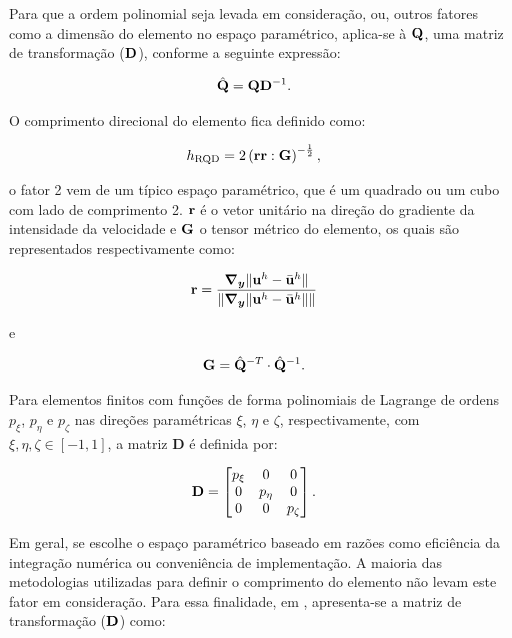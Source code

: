 \documentclass[tese_patricia]{subfiles}%
\begin{document}
Para que a ordem polinomial seja levada em consideração, ou, outros fatores como a dimensão do elemento no espaço paramétrico, aplica-se à $\mathbf{Q}$, uma matriz de transformação ($\mathbf{D}$), conforme a seguinte expressão:

\begin{align}
	\hat{\mathbf{Q}}&=\mathbf{Q}\mathbf{D}^{-1} \label{eq:q_chap}.
\end{align}

O comprimento direcional do elemento fica definido como:

\begin{align}
	h_{\mathrm{RQD}} &=2\left(\mathbf{r}\mathbf{r} : \mathbf{G} \right)^{-\frac{1}{2}},
\end{align}

\noindent o fator 2 vem de um típico espaço paramétrico, que é um quadrado ou um cubo com lado de comprimento 2. $\mathbf{r}$ é o vetor unitário na direção do gradiente da intensidade da velocidade e $\mathbf{G}$ o tensor métrico do elemento, os quais são representados respectivamente como:

\begin{align}
	\mathbf{r}&=\frac{\boldsymbol{\nabla_y} \lVert\mathbf{u}^h - \bar{\mathbf{u}}^h\rVert}{\lVert \boldsymbol{\nabla_y} \lVert\mathbf{u}^h - \bar{\mathbf{u}}^h\rVert\rVert} \label{eq:rRGN}
\end{align}

\noindent e

\begin{align}
	\mathbf{G} &= \hat{\mathbf{Q}}^{-T} \cdot \hat{\mathbf{Q}}^{-1}. \label{eq:tensor_metrico}
\end{align}

Para elementos finitos com funções de forma polinomiais de Lagrange de ordens $p_\xi$, $p_\eta$ e $p_\zeta$ nas direções paramétricas $\xi$, $\eta$ e $\zeta$, respectivamente, com $\xi, \eta, \zeta \in [-1, 1]$, a matriz $\mathbf{D}$ é definida por:

\begin{align}
	\mathbf{D}&=\begin{bmatrix}
		p_{\xi} & 0 & 0\\
		0 & p_{\eta} & 0 \\
		0 & 0 & p_{\zeta}
	\end{bmatrix}.
\end{align}

Em geral, se escolhe o espaço paramétrico baseado em razões como eficiência da integração numérica ou conveniência de implementação. A maioria das metodologias utilizadas para definir o comprimento do elemento não levam este fator em consideração. Para essa finalidade, em , apresenta-se a matriz de transformação ($\mathbf{D}$) como:
\end{document}
